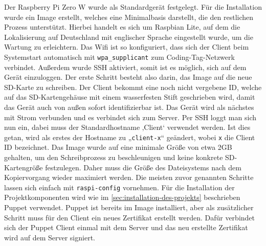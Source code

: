 Der Raspberry Pi Zero W wurde als Standardgerät festgelegt. Für die Installation
wurde ein Image erstellt, welches eine Minimalbasis darstellt, die den
restlichen Prozess unterstützt. Hierbei handelt es sich um Raspbian Lite, auf dem
die Lokalisierung auf Deutschland mit englischer Sprache eingestellt wurde, um
die Wartung zu erleichtern. Das Wifi ist so konfiguriert, dass sich der Client
beim Systemstart automatisch mit \texttt{wpa\_supplicant} zum Coding-Tag-Netzwerk
verbindet. Außerdem wurde SSH aktiviert, somit ist es möglich, sich auf dem Gerät
einzuloggen. Der erste Schritt besteht also darin, das Image auf die neue
SD-Karte zu schreiben. Der Client bekommt eine noch nicht vergebene ID, welche
auf das SD-Kartengehäuse mit einem wasserfesten Stift geschrieben wird, damit
das Gerät auch von außen sofort identifizierbar ist. Das Gerät wird als nächstes
mit Strom verbunden und es verbindet sich zum Server. Per SSH loggt man sich
nun ein, dabei muss der Standardhostname ‚Client‘ verwendet werden. Ist dies
getan, wird als erstes der Hostname zu „\texttt{client-x}“ geändert, wobei 
\texttt{x} die Client ID bezeichnet. Das Image wurde auf eine minimale Größe
von etwa 2GB gehalten, um den Schreibprozess zu beschleunigen und
keine konkrete SD-Kartengröße festzulegen. Daher muss die Größe des Dateisystems
nach dem Kopiervorgang wieder maximiert werden. Die meisten zuvor genannten
Schritte lassen sich einfach mit \texttt{raspi-config} vornehmen. Für die
Installation der Projektkomponenten wird wie im \cref{sec:installation-des-projekts}
beschrieben Puppet verwendet. Puppet ist bereits im Image installiert, aber
als zusätzlicher Schritt muss für den Client ein neues Zertifikat erstellt
werden. Dafür verbindet sich der Puppet Client einmal mit dem Server und das
neu erstellte Zertifikat wird auf dem Server signiert.

